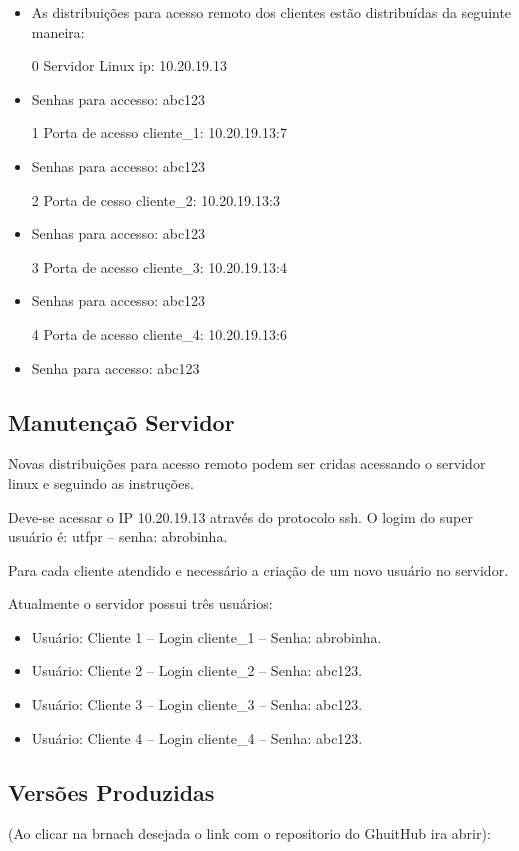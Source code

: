 \documentclass[	DIV=calc,%
							paper=a4,%
							fontsize=12pt,%
							onecolumn]{scrartcl}	 					%
\begin{document}
\begin{itemize}

\item As distribuições para acesso remoto dos clientes estão distribuídas da seguinte maneira:

\item[0] Servidor Linux ip: 10.20.19.13
\item Senhas para accesso: abc123
\item[1] Porta de acesso cliente\_1: 10.20.19.13:7
\item Senhas para accesso: abc123
\item[2] Porta de cesso cliente\_2: 10.20.19.13:3
\item Senhas para accesso: abc123
\item[3] Porta de acesso cliente\_3: 10.20.19.13:4
\item Senhas para accesso: abc123
\item[4] Porta de acesso cliente\_4: 10.20.19.13:6
\item Senha para accesso: abc123
\end{itemize}

\subsection{Manutençaõ Servidor}

Novas distribuições para acesso remoto podem ser cridas acessando o servidor linux e seguindo as instruções.

Deve-se acessar o IP 10.20.19.13 através do protocolo ssh.
O logim do super usuário é: utfpr – senha: abrobinha.

Para cada cliente atendido e necessário a criação de um novo usuário no servidor.

Atualmente o servidor possui três usuários:
\begin{itemize}
\item Usuário: Cliente 1 – Login cliente\_1 – Senha: abrobinha.
\item Usuário: Cliente 2 – Login cliente\_2 – Senha: abc123.
\item Usuário: Cliente 3 – Login cliente\_3 – Senha: abc123.
\item Usuário: Cliente 4 – Login cliente\_4 – Senha: abc123.
\end{itemize}



\subsection{Versões Produzidas}
(Ao clicar na brnach desejada o link com o repositorio do GhuitHub ira abrir):
\end{document}

